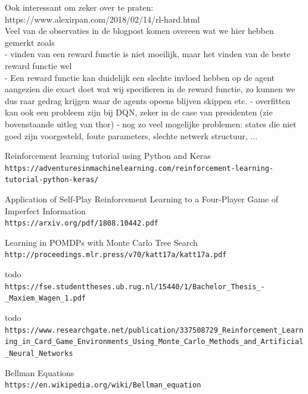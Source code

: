 \documentclass[11pt]{article}
\begin{document}
Ook interessant om zeker over te praten:\\
https://www.alexirpan.com/2018/02/14/rl-hard.html\\
Veel van de observaties in de blogpost komen overeen wat we hier hebben gemerkt zoals\\
- vinden van een reward functie is niet moeilijk, maar het vinden van de beste reward functie wel\\
- Een reward functie kan duidelijk een slechte invloed hebben op de agent aangezien die exact doet wat wij specifieren in de reward functie, zo kunnen we dus raar gedrag krijgen waar de agents opeens blijven skippen etc.
- overfitten kan ook een probleem zijn bij DQN, zeker in de case van presidenten (zie bovenstaande uitleg van thor)
- nog zo veel mogelijke problemen: states die niet goed zijn voorgesteld, foute parameters, slechte netwerk structuur, ...

\begin{thebibliography}{9}
Reinforcement learning tutorial using Python and Keras 
\\\texttt{https://adventuresinmachinelearning.com/reinforcement-learning-tutorial-python-keras/}

Application of Self-Play Reinforcement Learning to a Four-Player Game of Imperfect Information
\\\texttt{https://arxiv.org/pdf/1808.10442.pdf}

Learning in POMDPs with Monte Carlo Tree Search
\\\texttt{http://proceedings.mlr.press/v70/katt17a/katt17a.pdf}

todo
\\\texttt{https://fse.studenttheses.ub.rug.nl/15440/1/Bachelor\_Thesis\_-\_Maxiem\_Wagen\_1.pdf}

todo
\\\texttt{https://www.researchgate.net/publication/337508729\_Reinforcement\_Learning\_in\_Card\_Game\_Environments\_Using\_Monte\_Carlo\_Methods\_and\_Artificial\_Neural\_Networks}

Bellman Equations
\\\texttt{https://en.wikipedia.org/wiki/Bellman\_equation}
\end{thebibliography}
\end{document}
